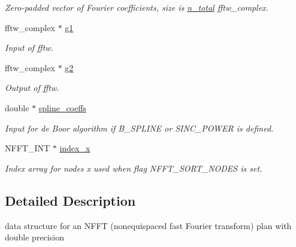 \begin{DoxyCompactItemize}
\begin{DoxyCompactList}\small\item\em Zero-\/padded vector of Fourier coefficients, size is \hyperlink{structnfft__plan_a9ffe9fb93c209bfc0d6a1386cb450379}{n\-\_\-total} fftw\-\_\-complex. \end{DoxyCompactList}\item 
\hypertarget{structnfft__plan_a2190e7201c55214d153b4d91eaa7efda}{fftw\-\_\-complex $\ast$ \hyperlink{structnfft__plan_a2190e7201c55214d153b4d91eaa7efda}{g1}}\label{structnfft__plan_a2190e7201c55214d153b4d91eaa7efda}

\begin{DoxyCompactList}\small\item\em Input of fftw. \end{DoxyCompactList}\item 
\hypertarget{structnfft__plan_ad96e0aa935ea3589e999c131c43d8a78}{fftw\-\_\-complex $\ast$ \hyperlink{structnfft__plan_ad96e0aa935ea3589e999c131c43d8a78}{g2}}\label{structnfft__plan_ad96e0aa935ea3589e999c131c43d8a78}

\begin{DoxyCompactList}\small\item\em Output of fftw. \end{DoxyCompactList}\item 
\hypertarget{structnfft__plan_a3aaf44c4f0769644075d9fc5ed60afa0}{double $\ast$ \hyperlink{structnfft__plan_a3aaf44c4f0769644075d9fc5ed60afa0}{spline\-\_\-coeffs}}\label{structnfft__plan_a3aaf44c4f0769644075d9fc5ed60afa0}

\begin{DoxyCompactList}\small\item\em Input for de Boor algorithm if B\-\_\-\-S\-P\-L\-I\-N\-E or S\-I\-N\-C\-\_\-\-P\-O\-W\-E\-R is defined. \end{DoxyCompactList}\item 
N\-F\-F\-T\-\_\-\-I\-N\-T $\ast$ \hyperlink{structnfft__plan_aff966ba9cb0897596c89b6f1b23ee317}{index\-\_\-x}
\begin{DoxyCompactList}\small\item\em Index array for nodes x used when flag N\-F\-F\-T\-\_\-\-S\-O\-R\-T\-\_\-\-N\-O\-D\-E\-S is set. \end{DoxyCompactList}\end{DoxyCompactItemize}


\subsection{Detailed Description}
data structure for an N\-F\-F\-T (nonequispaced fast Fourier transform) plan with double precision 

